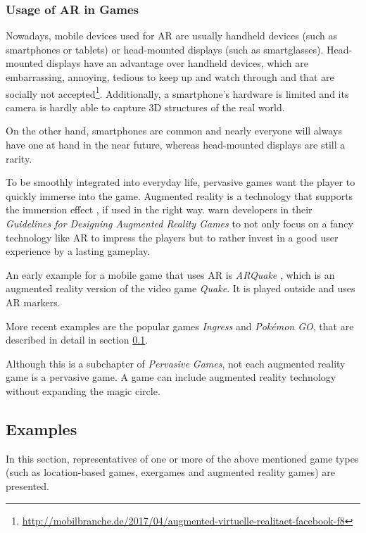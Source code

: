 \subsubsection{Usage of AR in Games}\label{sec:usageOfARStateOfTheArt}
Nowadays, mobile devices used for AR are usually handheld devices (such as smartphones or tablets) or head-mounted displays (such as smartglasses). Head-mounted displays have an advantage over handheld devices, which are embarrassing, annoying, tedious to keep up and watch through and that are socially not accepted\footnote{\url{http://mobilbranche.de/2017/04/augmented-virtuelle-realitaet-facebook-f8}}. Additionally, a smartphone's hardware is limited and its camera is hardly able to capture 3D structures of the real world.

On the other hand, smartphones are common and nearly everyone will always have one at hand in the near future, whereas head-mounted displays are still a rarity.

To be smoothly integrated into everyday life, pervasive games want the player to quickly immerse into the game. Augmented reality is a technology that supports the immersion effect \citep{waern2009three}, if used in the right way. \citeauthor{wetzel2008guidelines} warn developers in their \emph{Guidelines for Designing Augmented Reality Games} \citep{wetzel2008guidelines} to not only focus on a fancy technology like AR to impress the players but to rather invest in a good user experience by a lasting gameplay.

An early example for a mobile game that uses AR is \emph{ARQuake} \citep{piekarski2002arquake}, which is an augmented reality version of the video game \emph{Quake}. It is played outside and uses AR markers.

More recent examples are the popular games \emph{Ingress} and \emph{Pok\'{e}mon GO}, that are described in detail in section \ref{sec:examples}.

Although this is a subchapter of \emph{Pervasive Games}, not each augmented reality game is a pervasive game. A game can include augmented reality technology without expanding the magic circle.

\subsection{Examples}\label{sec:examples}
In this section, representatives of one or more of the above mentioned game types (such as location-based games, exergames and augmented reality games) are presented.

